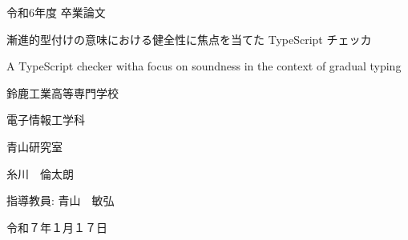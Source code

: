 \documentclass[
  luatex,
  paper=a4paper,
  fontsize=11pt,
  report,
  jlreq_notes,
]{jlreq}
\begin{document}
\begin{titlepage}
    \noindent
    \centering

    \vfill

    \LARGE{令和6年度 卒業論文}

    \vspace{10mm}

    \Huge{漸進的型付けの意味における健全性に焦点を当てた TypeScript チェッカ}

    \vspace{2mm}

    \LARGE{A TypeScript checker witha focus on soundness in the context of gradual typing}

    \vfill

    \Large{鈴鹿工業高等専門学校}

    \Large{電子情報工学科}

    \Large{青山研究室}

    \vspace{5mm}

    \LARGE{糸川　倫太朗}

    \vfill

    \Large{指導教員: 青山　敏弘}

    \vspace{2mm}

    \Large{令和７年１月１７日}
\end{titlepage}



\tableofcontents

\clearpage




\end{document}
